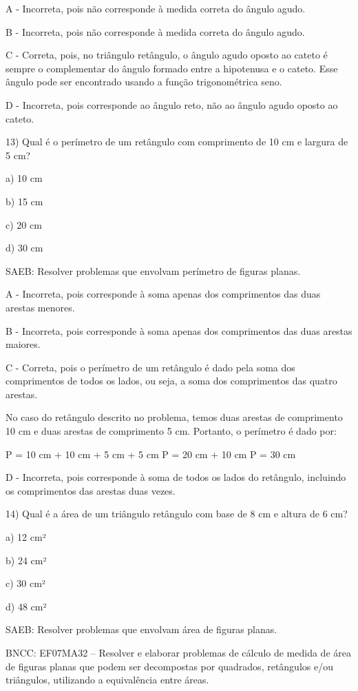 A - Incorreta, pois não corresponde à medida correta do ângulo agudo.

B - Incorreta, pois não corresponde à medida correta do ângulo agudo.

C - Correta, pois, no triângulo retângulo, o ângulo agudo oposto ao
cateto é sempre o complementar do ângulo formado entre a hipotenusa e o
cateto. Esse ângulo pode ser encontrado usando a função trigonométrica
seno.

D - Incorreta, pois corresponde ao ângulo reto, não ao ângulo agudo
oposto ao cateto.

13) Qual é o perímetro de um retângulo com comprimento de 10 cm e
largura de 5 cm?

a) 10 cm

b) 15 cm

c) 20 cm

d) 30 cm

SAEB: Resolver problemas que envolvam perímetro de figuras planas.

A - Incorreta, pois corresponde à soma apenas dos comprimentos das duas
arestas menores.

B - Incorreta, pois corresponde à soma apenas dos comprimentos das duas
arestas maiores.

C - Correta, pois o perímetro de um retângulo é dado pela soma dos
comprimentos de todos os lados, ou seja, a soma dos comprimentos das
quatro arestas.

No caso do retângulo descrito no problema, temos duas arestas de
comprimento 10 cm e duas arestas de comprimento 5 cm. Portanto, o
perímetro é dado por:

P = 10 cm + 10 cm + 5 cm + 5 cm P = 20 cm + 10 cm P = 30 cm

D - Incorreta, pois corresponde à soma de todos os lados do retângulo,
incluindo os comprimentos das arestas duas vezes.

14) Qual é a área de um triângulo retângulo com base de 8 cm e altura de
6 cm?

a) 12 cm²

b) 24 cm²

c) 30 cm²

d) 48 cm²

SAEB: Resolver problemas que envolvam área de figuras planas.

BNCC: EF07MA32 -- Resolver e elaborar problemas de cálculo de medida de
área de figuras planas que podem ser decompostas por quadrados,
retângulos e/ou triângulos, utilizando a equivalência entre áreas.

